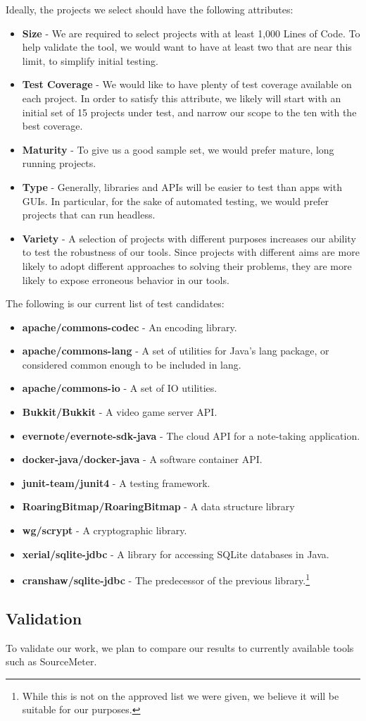 Ideally, the projects we select should have the following attributes:

\begin{itemize}
\item \textbf{Size} - We are required to select projects with at least 1,000 Lines of Code. To help validate the tool, we would want to have at least two that are near this limit, to simplify initial testing.
\item \textbf{Test Coverage} - We would like to have plenty of test coverage available on each project. In order to satisfy this attribute, we likely will start with an initial set of 15 projects under test, and narrow our scope to the ten with the best coverage.
\item \textbf{Maturity} - To give us a good sample set, we would prefer mature, long running projects.
\item \textbf{Type} - Generally, libraries and APIs will be easier to test than apps with GUIs. In particular, for the sake of automated testing, we would prefer projects that can run headless.
\item \textbf{Variety} - A selection of projects with different purposes increases our ability to test the robustness of our tools. Since projects with different aims are more likely to adopt different approaches to solving their problems, they are more likely to expose erroneous behavior in our tools.
\end{itemize}

The following is our current list of test candidates:

\begin{itemize}
	\item \textbf{apache/commons-codec} - An encoding library.
    \item \textbf{apache/commons-lang} - A set of utilities for Java's lang package, or considered common enough to be included in lang.
    \item \textbf{apache/commons-io} - A set of IO utilities.
    \item \textbf{Bukkit/Bukkit} - A video game server API.
    \item \textbf{evernote/evernote-sdk-java} - The cloud API for a note-taking application.
    \item \textbf{docker-java/docker-java} - A software container API.
    \item \textbf{junit-team/junit4} - A testing framework.
    \item \textbf{RoaringBitmap/RoaringBitmap} - A data structure library
    \item \textbf{wg/scrypt} - A cryptographic library.
    \item \textbf{xerial/sqlite-jdbc} - A library for accessing SQLite databases in Java.
    \item \textbf{cranshaw/sqlite-jdbc} - The predecessor of the previous library.\footnote{While this is not on the approved list we were given, we believe it will be suitable for our purposes.}
\end{itemize}

\subsection{Validation}

To validate our work, we plan to compare our results to currently available tools such as SourceMeter. 
